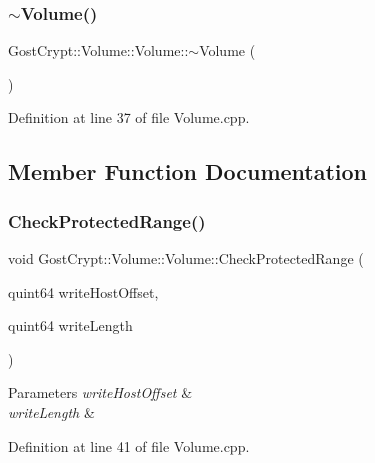 \subsubsection{\texorpdfstring{$\sim$\+Volume()}{~Volume()}}
{\footnotesize\ttfamily Gost\+Crypt\+::\+Volume\+::\+Volume\+::$\sim$\+Volume (\begin{DoxyParamCaption}{ }\end{DoxyParamCaption})\hspace{0.3cm}{\ttfamily [virtual]}}



Definition at line 37 of file Volume.\+cpp.



\subsection{Member Function Documentation}
\mbox{\label{class_gost_crypt_1_1_volume_1_1_volume_ac017a0e293b1fc5933af41dba214d1bb}} 
\subsubsection{\texorpdfstring{Check\+Protected\+Range()}{CheckProtectedRange()}}
{\footnotesize\ttfamily void Gost\+Crypt\+::\+Volume\+::\+Volume\+::\+Check\+Protected\+Range (\begin{DoxyParamCaption}\item[{quint64}]{write\+Host\+Offset,  }\item[{quint64}]{write\+Length }\end{DoxyParamCaption})\hspace{0.3cm}{\ttfamily [protected]}}


\begin{DoxyParams}{Parameters}
{\em write\+Host\+Offset} & \\
\hline
{\em write\+Length} & \\
\hline
\end{DoxyParams}


Definition at line 41 of file Volume.\+cpp.

\mbox{\label{class_gost_crypt_1_1_volume_1_1_volume_acd693e8d3c7bd6b42b84f5a08b15cd88}} 
